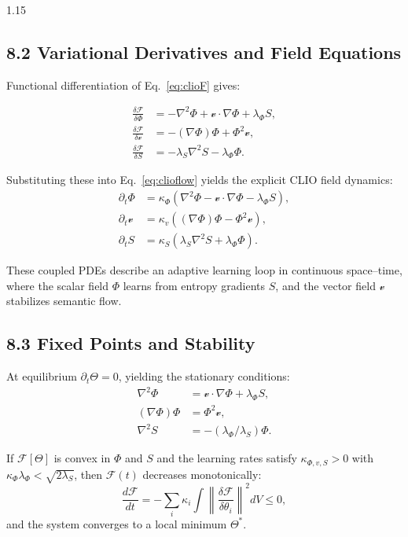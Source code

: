 \documentclass[12pt,a4paper]{article}
\begin{document}
\begin{spacing}{1.15}
\subsection{8.2 Variational Derivatives and Field Equations}

Functional differentiation of Eq.~\eqref{eq:clioF} gives:

\begin{align}
\frac{\delta \mathcal{F}}{\delta \Phi}
 &= -\nabla^2\Phi + \boldsymbol{\mathcal v}\!\cdot\!\nabla\Phi
    + \lambda_\Phi S ,\\[3pt]
\frac{\delta \mathcal{F}}{\delta \boldsymbol{\mathcal v}}
 &= -(\nabla\Phi)\Phi + \Phi^2 \boldsymbol{\mathcal v},\\[3pt]
\frac{\delta \mathcal{F}}{\delta S}
 &= -\lambda_S\nabla^2 S - \lambda_\Phi \Phi .
\end{align}

Substituting these into Eq.~\eqref{eq:clioflow} yields the explicit CLIO field dynamics:
\begin{align}
\partial_t \Phi
 &= \kappa_{\Phi}\!\left(\nabla^2\Phi - \boldsymbol{\mathcal v}\!\cdot\!\nabla\Phi - \lambda_\Phi S\right),\\
\partial_t \boldsymbol{\mathcal v}
 &= \kappa_{v}\!\left((\nabla\Phi)\Phi - \Phi^2 \boldsymbol{\mathcal v}\right),\\
\partial_t S
 &= \kappa_{S}\!\left(\lambda_S\nabla^2 S + \lambda_\Phi \Phi\right).
\label{eq:cliofields}
\end{align}

These coupled PDEs describe an adaptive learning loop in continuous space–time, where the scalar field $\Phi$ learns from entropy gradients $S$, and the vector field $\boldsymbol{\mathcal v}$ stabilizes semantic flow.

\subsection{8.3 Fixed Points and Stability}

At equilibrium $\partial_t \Theta=0$, yielding the stationary conditions:
\begin{align}
\nabla^2\Phi &= \boldsymbol{\mathcal v}\!\cdot\!\nabla\Phi + \lambda_\Phi S,\\
(\nabla\Phi)\Phi &= \Phi^2 \boldsymbol{\mathcal v},\\
\nabla^2 S &= -(\lambda_\Phi/\lambda_S)\Phi.
\label{eq:clioeq}
\end{align}

\begin{theorem}
If $\mathcal{F}[\Theta]$ is convex in $\Phi$ and $S$ and the learning rates satisfy
$\kappa_{\Phi,v,S}\!>\!0$ with $\kappa_{\Phi}\lambda_\Phi<\!\!\sqrt{2\lambda_S}$,
then $\mathcal{F}(t)$ decreases monotonically:
\[
\frac{d\mathcal{F}}{dt} = -\sum_i \kappa_i \!\!\int \!\!\left\|\frac{\delta\mathcal{F}}{\delta\theta_i}\right\|^2\!dV \le 0,
\]
and the system converges to a local minimum $\Theta^\ast$.
\end{theorem}


\end{spacing}
\end{document}
